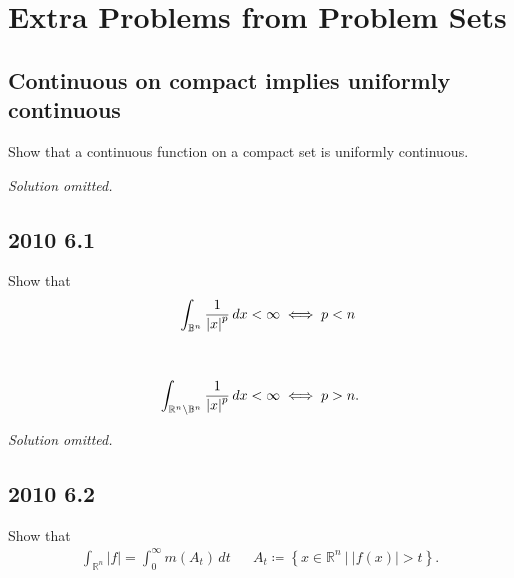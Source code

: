 \hypertarget{extra-problems-from-problem-sets}{%
\section{Extra Problems from Problem
Sets}\label{extra-problems-from-problem-sets}}

\hypertarget{continuous-on-compact-implies-uniformly-continuous}{%
\subsection{Continuous on compact implies uniformly
continuous}\label{continuous-on-compact-implies-uniformly-continuous}}

\begin{problem}[?]

Show that a continuous function on a compact set is uniformly
continuous.

\end{problem}

\emph{Solution omitted.}

\hypertarget{section}{%
\subsection{2010 6.1}\label{section}}

\begin{problem}[?]

Show that
\begin{align*}
\int_{{\mathbb{B}}^n} {1 \over {\left\lvert {x} \right\rvert}^p } \,dx&< \infty \iff p < n \\ \\ \\ 
\int_{{\mathbb{R}}^n\setminus{\mathbb{B}}^n} {1 \over {\left\lvert {x} \right\rvert}^p } \,dx&< \infty \iff p > n 
.\end{align*}

\end{problem}

\emph{Solution omitted.}

\hypertarget{section-1}{%
\subsection{2010 6.2}\label{section-1}}

Show that
\begin{align*}
\int_{{\mathbb{R}}^n} {\left\lvert { f} \right\rvert} = \int_0^{\infty } m(A_t)\,dt&& A_t \coloneqq\left\{{x\in {\mathbb{R}}^n {~\mathrel{\Big\vert}~}{\left\lvert {f(x)} \right\rvert} > t}\right\}
.\end{align*}

